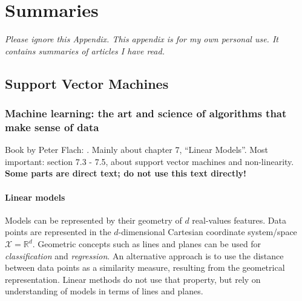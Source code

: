 
\chapter{Summaries} %

\label{AppendixA} %


\emph{Please ignore this Appendix.
This appendix is for my own personal use.
It contains summaries of articles I have read.
}
\section{Support Vector Machines}

\subsection{Machine learning: the art and science of algorithms that make sense of data}
Book by Peter Flach: \cite{flach2012machine}.
Mainly about chapter 7, ``Linear Models''.
Most important: section 7.3 - 7.5, about support vector machines and non-linearity.
\textbf{Some parts are direct text; do not use this text directly!}


\subsubsection{Linear models}
Models can be represented by their geometry of $d$ real-values features.
Data points are represented in the $d$-dimensional Cartesian coordinate system/space $\mathcal{X} = \mathbb{R}^d$.
Geometric concepts such as lines and planes can be used for \emph{classification} and \emph{regression}.
An alternative approach is to use the distance between data points as a similarity measure, resulting from the geometrical representation.
Linear methods do not use that property, but rely on understanding of models in terms of lines and planes.

